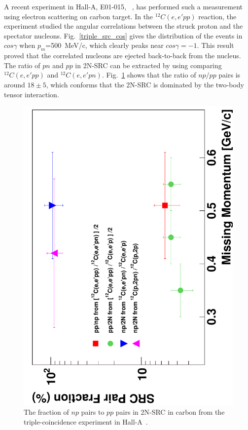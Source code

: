 A recent experiment in Hall-A, E01-015, ~\cite{PhysRevLett.99.072501,src_since}, has performed such a measurement using electron scattering on carbon target. In the $^{12}C(e,e'pp)$ reaction, the experiment studied the angular correlations between the struck proton and the spectator nucleons. Fig.~\ref{triple_src_cos} gives the distribution of the events in $cos\gamma$ when $p_{m}$=500~MeV/c, which clearly peaks near $cos\gamma=-1$. This result proved that the correlated nucleons are ejected back-to-back from the nucleus. The ratio of $pn$ and $pp$ in 2N-SRC can be extracted by using comparing $^{12}C(e,e'pp)$ and $^{12}C(e,e'pn)$. Fig.~\ref{triple_src_np} shows that the ratio of $np/pp$ pairs is around $18\pm 5$, which conforms that the 2N-SRC is dominated by the two-body tensor interaction. 
\begin{figure}[!ht]
  \begin{center}
    \includegraphics[type=pdf,angle=270,ext=.pdf,read=.pdf,width=0.60\linewidth]{./figures/physics/10yrSRC_fig7}
    \caption[The fraction of $np$ pairs to $pp$ pairs in 2N-SRC]{\footnotesize{The fraction of $np$ pairs to $pp$ pairs in 2N-SRC in carbon from the triple-coincidence experiment in Hall-A~\cite{src_since}.}}
    \label{triple_src_np}
  \end{center}
\end{figure} 